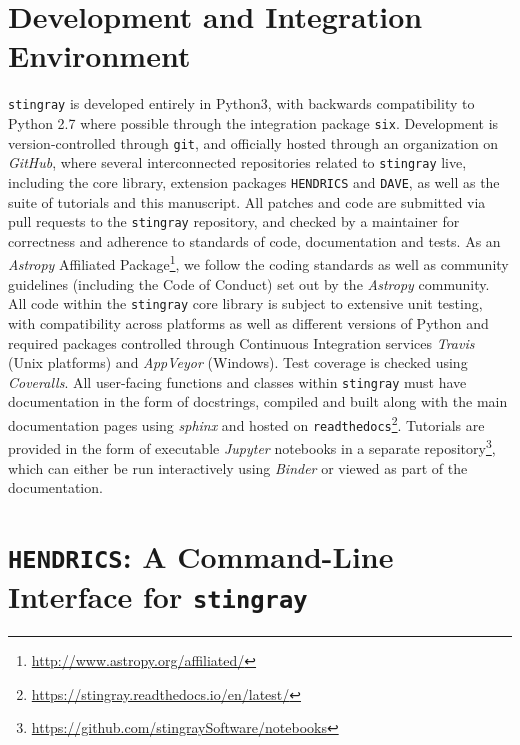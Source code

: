 \documentclass[twocolumn]{aastex62}
\newcommand{\stingray}{\texttt{stingray}\xspace}
\newcommand{\hendrics}{\texttt{HENDRICS}\xspace}
\begin{document}

\section{Development and Integration Environment}
\label{sec:development}

\stingray is developed entirely in Python3, with backwards compatibility to Python 2.7 where possible through the integration package \texttt{six}. Development is version-controlled through \texttt{git}, and officially hosted through an organization on \textit{GitHub}, where several interconnected repositories related to \stingray live, including the core library, extension packages \hendrics and \texttt{DAVE}, as well as the suite of tutorials and this manuscript. All patches and code are submitted via pull requests to the \stingray repository, and checked by a maintainer for correctness and adherence to standards of code, documentation and tests. As an \textit{Astropy} Affiliated Package\footnote{\url{http://www.astropy.org/affiliated/}}, we follow the coding standards as well as community guidelines (including the Code of Conduct) set out by the \textit{Astropy} community. 
All code within the \stingray core library is subject to extensive unit testing, with compatibility across platforms as well as different versions of Python and required packages controlled through Continuous Integration services \textit{Travis} (Unix platforms) and \textit{AppVeyor} (Windows). Test coverage is checked using \textit{Coveralls}. 
All user-facing functions and classes within \stingray must have documentation in the form of docstrings, compiled and built along with the main documentation pages using \textit{sphinx} and hosted on \texttt{readthedocs}\footnote{\url{https://stingray.readthedocs.io/en/latest/}}. Tutorials are provided in the form of executable \textit{Jupyter} notebooks in a separate repository\footnote{\url{https://github.com/stingraySoftware/notebooks}}, which can either be run interactively using \textit{Binder} \citep{project_jupyter-proc-scipy-2018} or viewed as part of the documentation. 


\section{\hendrics: A Command-Line Interface for \stingray}
\label{sec:hendrics}
\end{document}
